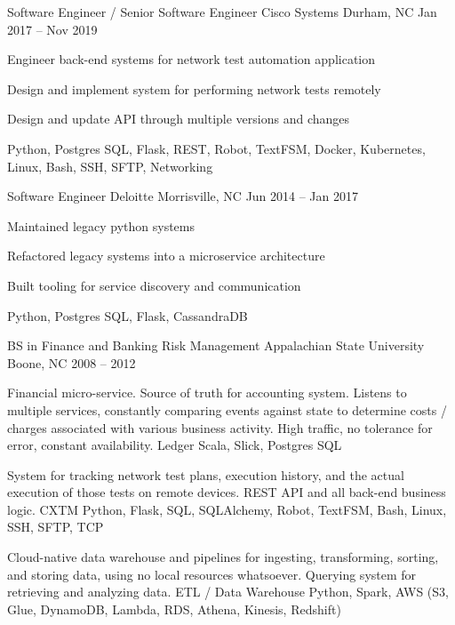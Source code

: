 \documentclass[]{awesome-cv}
\begin{document}
\begin{cventries}
{\begin{cvitems}
		\end{cvitems}}
	\cventry
	{Software Engineer / Senior Software Engineer}
	{Cisco Systems}
	{Durham, NC}
	{Jan 2017 – Nov 2019}
	{\begin{cvitems}
		\item {Engineer back-end systems for network test automation application}
		\item {Design and implement system for performing network tests remotely}
		\item {Design and update API through multiple versions and changes}
		\item {Python, Postgres SQL, Flask, REST, Robot, TextFSM, Docker, Kubernetes, Linux, Bash, SSH, SFTP, Networking}
		\end{cvitems}}
	\cventry
	{Software Engineer}
	{Deloitte}
	{Morrisville, NC}
	{Jun 2014 – Jan 2017}
	{\begin{cvitems}
		\item {Maintained legacy python systems}
		\item {Refactored legacy systems into a microservice architecture}
		\item {Built tooling for service discovery and communication}
		\item {Python, Postgres SQL, Flask, CassandraDB}
		\end{cvitems}}
\end{cventries}
\begin{cventries}
	\cventry
	{BS in Finance and Banking \textbar{} Risk Management}
	{Appalachian State University}
	{Boone, NC}
	{2008 – 2012}
	{}
\end{cventries}

\vspace{-5mm}

\begin{cventries}
	\cventry
	{Financial micro-service. Source of truth for accounting system. Listens to multiple services, constantly comparing events against state to determine costs / charges associated with various business activity. High traffic, no tolerance for error, constant availability.}
	{Ledger}
	{Scala, Slick, Postgres SQL}
	{}
	{}

	\vspace{-5mm}
	\cventry
	{System for tracking network test plans, execution history, and the actual execution of those tests on remote devices. REST API and all back-end business logic.}
	{CXTM}
	{Python, Flask, SQL, SQLAlchemy, Robot, TextFSM, Bash, Linux, SSH, SFTP, TCP}
	{}
	{}

	\vspace{-5mm}
	\cventry
	{Cloud-native data warehouse and pipelines for ingesting, transforming, sorting, and storing data, using no local resources whatsoever. Querying system for retrieving and analyzing data.}
	{ETL / Data Warehouse}
	{Python, Spark, AWS (S3, Glue, DynamoDB, Lambda, RDS, Athena, Kinesis, Redshift)}
	{}
	{}

\end{cventries}
\end{document}
